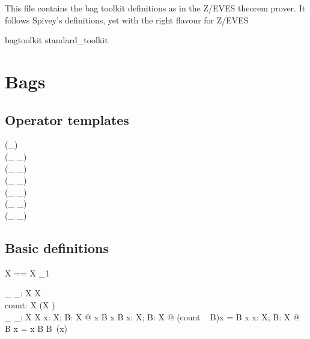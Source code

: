 \documentclass[draft,a4paper,10pt,wd]{article}
\begin{document}
This file contains the bag toolkit definitions as in the Z/EVES
theorem prover. It follows Spivey's definitions, yet with the
right flavour for Z/EVES

\begin{zsection}
\SECTION bagtoolkit \parents standard\_toolkit
\end{zsection}

\section{Bags }\label{def-bag}

\subsection*{Operator templates}

\begin{zed}
    \generic (\bag \_) \\
     \leftassoc (\_ \bcount \_) \\
     \leftassoc (\_ \otimes \_) \\
    \relation (\_ \inbag \_) \\
    \relation (\_ \subbageq \_) \\
     \leftassoc (\_ \uplus \_) \\
     \leftassoc (\_ \uminus \_)
\end{zed}

\subsection*{Basic definitions}

\begin{zed}
  \bag X == X \pfun \nat_1
\end{zed}

\begin{gendef}[X]
  \_ \inbag \_: X \rel \bag X \\
  count: \bag X \fun (X \fun \nat) \\
  \_ \bcount \_: \bag X \cross X \fun \nat
\where
  \forall x: X; B: \bag X @ x \inbag B \iff x \in \dom B
\also
  \forall x: X; B: \bag X @ (count ~ B)x = B \bcount x
\also
  \forall x: X; B: \bag X @ B \bcount x =
    \IF x \inbag B \THEN B~(x) 
\end{gendef}
\end{document}
